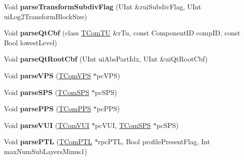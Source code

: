 \begin{DoxyCompactItemize}
\item 
\mbox{\label{class_t_dec_cavlc_a082c58977555242220809c68b51acff7}} 
Void {\bfseries parse\+Transform\+Subdiv\+Flag} (U\+Int \&rui\+Subdiv\+Flag, U\+Int ui\+Log2\+Transform\+Block\+Size)
\item 
\mbox{\label{class_t_dec_cavlc_a1c823ae9462cc58b39283a60c0a5a221}} 
Void {\bfseries parse\+Qt\+Cbf} (class \hyperlink{class_t_com_t_u}{T\+Com\+TU} \&r\+Tu, const Component\+ID comp\+ID, const Bool lowest\+Level)
\item 
\mbox{\label{class_t_dec_cavlc_ac73014e85d4fd5ab1461bfa43d579155}} 
Void {\bfseries parse\+Qt\+Root\+Cbf} (U\+Int ui\+Abs\+Part\+Idx, U\+Int \&ui\+Qt\+Root\+Cbf)
\item 
\mbox{\label{class_t_dec_cavlc_a3723ba6f9a8477217d857312c4e82816}} 
Void {\bfseries parse\+V\+PS} (\hyperlink{class_t_com_v_p_s}{T\+Com\+V\+PS} $\ast$pc\+V\+PS)
\item 
\mbox{\label{class_t_dec_cavlc_a20ab4ea429006be74e29bae2dbd3e8f2}} 
Void {\bfseries parse\+S\+PS} (\hyperlink{class_t_com_s_p_s}{T\+Com\+S\+PS} $\ast$pc\+S\+PS)
\item 
\mbox{\label{class_t_dec_cavlc_a7b6c98780e701b1c78249365d63ca5aa}} 
Void {\bfseries parse\+P\+PS} (\hyperlink{class_t_com_p_p_s}{T\+Com\+P\+PS} $\ast$pc\+P\+PS)
\item 
\mbox{\label{class_t_dec_cavlc_a637a570c00339c73723e0d2d009c3f8e}} 
Void {\bfseries parse\+V\+UI} (\hyperlink{class_t_com_v_u_i}{T\+Com\+V\+UI} $\ast$pc\+V\+UI, \hyperlink{class_t_com_s_p_s}{T\+Com\+S\+PS} $\ast$pc\+S\+PS)
\item 
\mbox{\label{class_t_dec_cavlc_a2e3de06b0cc3b7e5caa63a5e6aeb4999}} 
Void {\bfseries parse\+P\+TL} (\hyperlink{class_t_com_p_t_l}{T\+Com\+P\+TL} $\ast$rpc\+P\+TL, Bool profile\+Present\+Flag, Int max\+Num\+Sub\+Layers\+Minus1)
\item 
\mbox{\label{class_t_dec_cavlc_a652d94a707e794df8e51ecfbb62b4705}} 

\end{DoxyCompactItemize}
